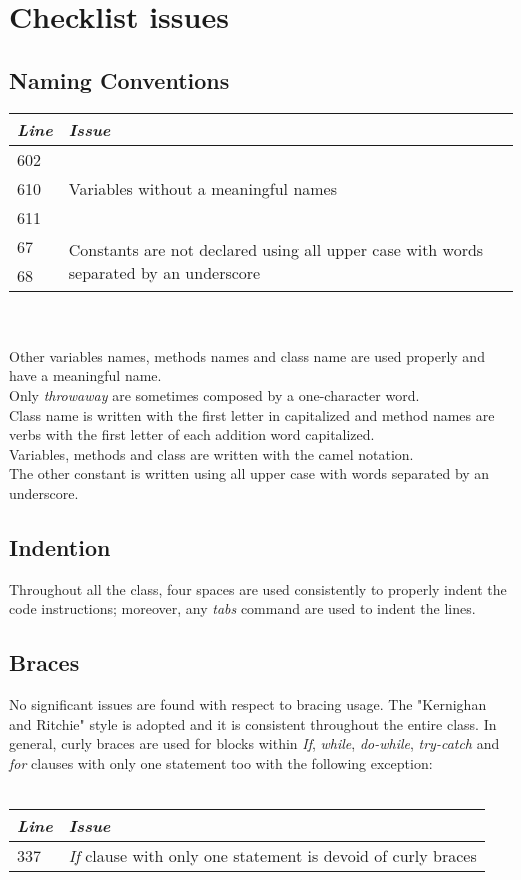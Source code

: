 \documentclass[11pt,a4paper]{report}
\begin{document}
\section{Checklist issues}
\subsection{Naming Conventions}
\begin{tabularx}{\textwidth}{|l|X|}
	\hline
	\textit{Line} & \textit{Issue}\\
	\hline \hline
	602 & \multirow{3}{*}{Variables without a meaningful names}\\
	610 & \\
	611 & \\
	\hline
	67 & \multirow{2}{\linewidth}{{Constants are not declared using all upper case with words separated by an underscore}}\\
	68 & \\
	\hline
\end{tabularx}
\\\\
Other variables names, methods names and class name are used properly and have a meaningful name.\\Only \textit{throwaway} are sometimes composed by a one-character word.\\Class name is written with the first letter in capitalized and method names are verbs with the first letter of each addition word capitalized.\\Variables, methods and class are written with the camel notation.\\The other constant is written using all upper case with words separated by an underscore.
\subsection{Indention}
Throughout all the class, four spaces are used consistently to properly indent the code instructions; moreover, any \textit{tabs} command are used to indent the lines.
\subsection{Braces}
No significant issues are found with respect to bracing usage. The "Kernighan and Ritchie" style is adopted and it is consistent throughout the entire class. In general, curly braces are used for blocks within \textit{If}, \textit{while}, \textit{do-while}, \textit{try-catch} and \textit{for} clauses with only one statement too with the following exception:
\\\\
\begin{tabularx}{\textwidth}{|l|X|}
	\hline
	\textit{Line} & \textit{Issue}\\
	\hline
	\hline
	337 & \multirow{1}{*}{\textit{If} clause with only one statement is devoid of curly braces}\\
	\hline
\end{tabularx}
\end{document}
